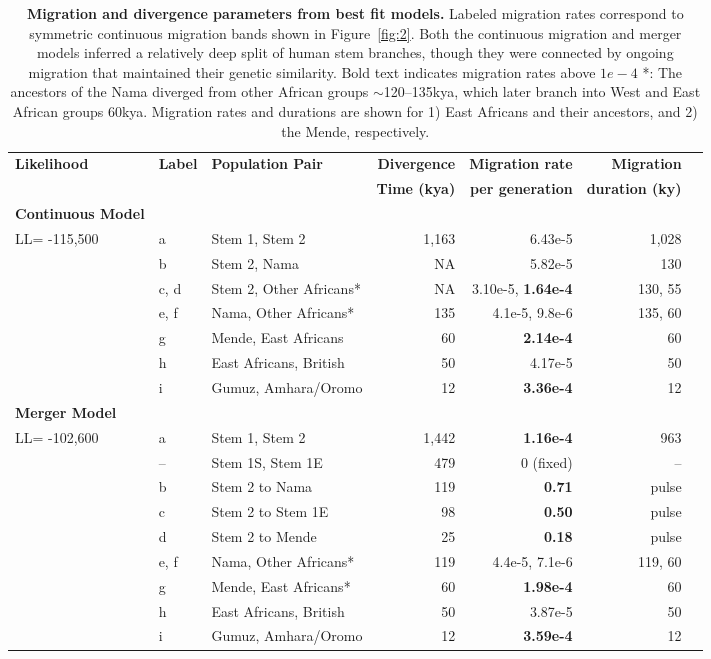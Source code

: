 \documentclass[]{article}
\begin{document}
\begin{table}[t!]
    \centering
    \scriptsize
    \begin{tabular}{lllrrrr}
        \toprule
        \textbf{Likelihood} & \textbf{Label} & \textbf{Population Pair} &
            \textbf{Divergence} & \textbf{Migration rate} & \textbf{Migration} \\
        & & & 
            \textbf{Time (kya)} & \textbf{per generation} & \textbf{duration (ky)} \\
        \midrule
        \textbf{Continuous Model} & & & & & \\
        LL= -115,500 & a & Stem 1, Stem 2 & 1,163 & 6.43e-5 & 1,028 \\
        & b & Stem 2, Nama & NA & 5.82e-5 & 130 \\
        & c, d & Stem 2, Other Africans* & NA & 3.10e-5, \textbf{1.64e-4} & 130, 55 \\
        & e, f & Nama, Other Africans* & 135 & 4.1e-5, 9.8e-6 & 135, 60 \\
        & g & Mende, East Africans & 60 & \textbf{2.14e-4} & 60 \\
        & h & East Africans, British & 50 & 4.17e-5 & 50 \\
        & i & Gumuz, Amhara/Oromo & 12 &\textbf{3.36e-4} & 12 \\
        \textbf{Merger Model} & & & & & \\
        LL= -102,600 & a & Stem 1, Stem 2 & 1,442 & \textbf{1.16e-4} & 963 \\
        & -- & Stem 1S, Stem 1E & 479 & 0 (fixed) & -- \\
        & b & Stem 2 to Nama & 119 & \textbf{0.71} & pulse \\
        & c & Stem 2 to Stem 1E & 98 & \textbf{0.50} & pulse \\
        & d & Stem 2 to Mende & 25 & \textbf{0.18} & pulse \\
        & e, f & Nama, Other Africans* & 119 & 4.4e-5, 7.1e-6 & 119, 60 \\
        & g & Mende, East Africans* & 60 & \textbf{1.98e-4} & 60 \\
        & h & East Africans, British & 50 & 3.87e-5 & 50 \\
        & i & Gumuz, Amhara/Oromo &12 & \textbf{3.59e-4} & 12 \\
        \bottomrule
    \end{tabular}
    \caption{
        \textbf{Migration and divergence parameters from best fit models.}
        Labeled migration rates correspond to symmetric continuous migration
        bands shown in Figure~\ref{fig:2}. Both the continuous migration and
        merger models inferred a relatively deep split of human stem branches,
        though they were connected by ongoing migration that maintained their
        genetic similarity. Bold text indicates migration rates above $1e-4$ 
        *: The ancestors of the Nama diverged from other African groups
        $\sim$120--135kya, which later branch into West and East African
        groups 60kya. Migration rates and durations are shown for 1) East Africans
        and their ancestors, and 2) the Mende, respectively.
    }
    \label{tab:migration-rates}
\end{table}
\end{document}
